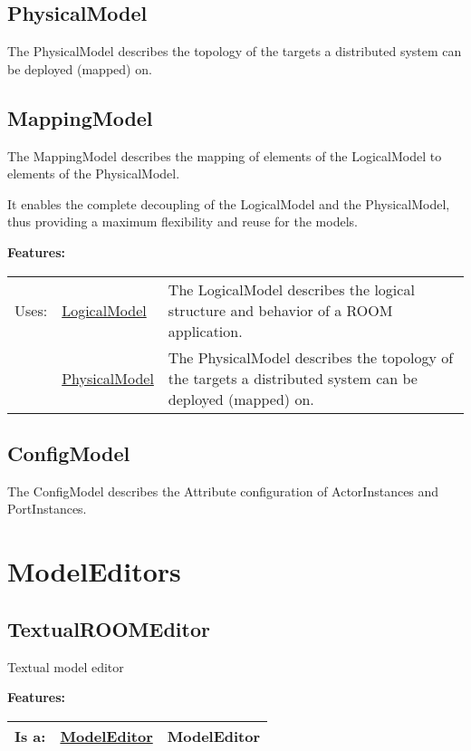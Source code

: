	\subsection{PhysicalModel}
	The PhysicalModel describes the topology of the targets a distributed system can be deployed (mapped) on.
	
	
	
	\subsection{MappingModel}
	The MappingModel describes the mapping of elements of the LogicalModel to elements of the PhysicalModel.
	
	It enables the complete decoupling of the LogicalModel and the PhysicalModel, thus providing a maximum flexibility and reuse for the models.
	
	\begingroup
	\textbf{Features:}
	\renewcommand{\arraystretch}{1.8} %
	\begin{longtable}{l|l p{}}
		\hline
	Uses: & \tabitem \hyperlink{ref:LogicalModel}{LogicalModel}  & The LogicalModel describes the logical structure and behavior of a ROOM application.\\
	& \tabitem \hyperlink{ref:PhysicalModel}{PhysicalModel}  & The PhysicalModel describes the topology of the targets a distributed system can be deployed (mapped) on. \\
	\hline
	\end{longtable}
	\endgroup
	
	\subsection{ConfigModel}
	The ConfigModel describes the Attribute configuration of ActorInstances and PortInstances. 
	
	
	
\section{ModelEditors}
	
	
	\subsection{TextualROOMEditor}
	Textual model editor
	
	
	\begingroup
	\textbf{Features:}
	\renewcommand{\arraystretch}{1.8} %
	\begin{longtable}{l|l p{}}
		\hline
	Is a: & \tabitem \hyperlink{ref:ModelEditor}{ModelEditor}  & ModelEditor\\
	\hline
	\end{longtable}
	\endgroup
	
